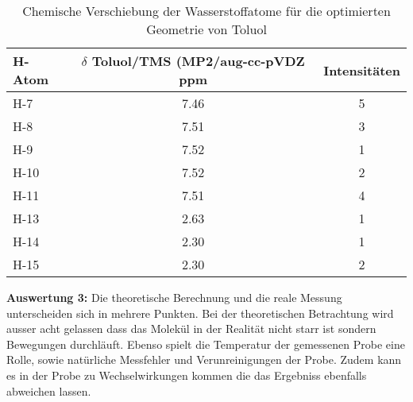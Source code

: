 \documentclass[12pt]{article}
\begin{document}
\begin{onehalfspace}
\begin{table}[!htpb]
\caption{Chemische Verschiebung der Wasserstoffatome für die optimierten Geometrie von Toluol}
\begin{tabular}{lcc}
\toprule
H-Atom  & \parbox[t]{4cm}{$\delta$ Toluol/TMS \\ (MP2/aug-cc-pVDZ\\ ppm}  &   Intensitäten\\
\midrule
H-7  & 7.46 &  5 \\
H-8  & 7.51 &  3  \\
H-9  & 7.52 &  1  \\
H-10 & 7.52 &  2 \\
H-11 & 7.51 &  4 \\
H-13 & 2.63 &  1 \\
H-14 & 2.30 &  1 \\
H-15 & 2.30 &  2 \\
\bottomrule
\end{tabular}
\end{table}



\textbf{Auswertung 3:}
Die theoretische Berechnung und die reale Messung unterscheiden sich in mehrere Punkten.  Bei der theoretischen Betrachtung wird ausser acht gelassen dass das Molekül in der Realität nicht starr ist sondern Bewegungen durchläuft. Ebenso spielt die Temperatur der gemessenen Probe eine Rolle, sowie natürliche Messfehler und Verunreinigungen der Probe. Zudem kann es in der Probe zu Wechselwirkungen kommen die das Ergebniss ebenfalls abweichen lassen.


\end{onehalfspace}
\end{document}
